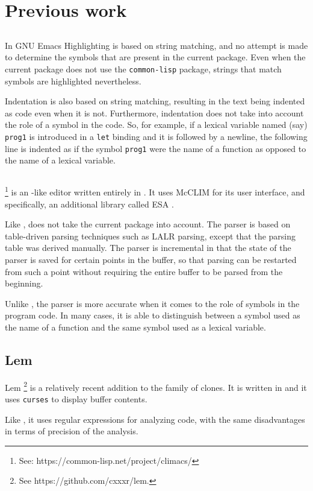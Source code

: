 \section{Previous work}

\subsection{\emacs{}}
\label{sec-previous-emacs}

In GNU Emacs
\cite{GNUEmacsLispReferenceManual,CraftOfTextEditiing,Finseth:1980:TPTa}
Highlighting is based on string matching, and no attempt is made to
determine the symbols that are present in the current package.
Even when the current package does not use the \texttt{common-lisp}
package, strings that match \commonlisp{} symbols are highlighted
nevertheless.

Indentation is also based on string matching, resulting in the text
being indented as \commonlisp{} code even when it is not.
Furthermore, indentation does not take into account the role of a
symbol in the code.  So, for example, if a lexical variable named
(say) \texttt{prog1} is introduced in a \texttt{let} binding and
it is followed by a newline, the following line is indented as if the
symbol \texttt{prog1} were the name of a \commonlisp{} function as
opposed to the name of a lexical variable.

\subsection{\climacs{}}

\climacs%
\footnote{See: https://common-lisp.net/project/climacs/}
is an \emacs{}-like editor written entirely in \commonlisp{}.  It uses
McCLIM \cite{Strandh:2002:ILC:McCLIM}
for its user interface, and specifically, an additional library called
ESA \cite{Strandh:2007:ECL:1622123.1622150}.

Like \emacs{}, \climacs{} does not take the current package into
account.  The parser is based on table-driven parsing techniques
such as LALR parsing, except that the parsing table was derived
manually.  The parser is incremental in that the state of the parser
is saved for certain points in the buffer, so that parsing can be
restarted from such a point without requiring the entire buffer to be
parsed from the beginning.

Unlike \emacs{}, the \climacs{} parser is more accurate when it comes
to the role of symbols in the program code.  In many cases, it is able
to distinguish between a symbol used as the name of a function and the
same symbol used as a lexical variable.

\subsection{Lem}

Lem%
\footnote{See https://github.com/cxxxr/lem.}
is a relatively recent addition to the family of \emacs{} clones.  It
is written in \commonlisp{} and it uses \texttt{curses} to display
buffer contents.

Like \emacs{} , it uses regular expressions
for analyzing \commonlisp{} code, with the same disadvantages in terms
of precision of the analysis.
